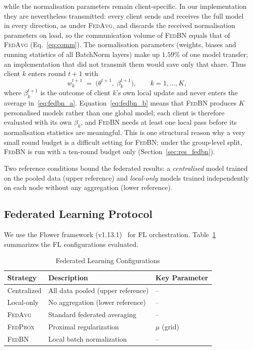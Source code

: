 \documentclass[journal]{IEEEtran}
\newcommand{\fedavg}{\textsc{FedAvg}}
\newcommand{\fedprox}{\textsc{FedProx}}
\newcommand{\fedbn}{\textsc{FedBN}}
\begin{document}
while the normalisation parameters remain client-specific. In our implementation they are nevertheless transmitted: every client sends and receives the full model in every direction, as under \fedavg{}, and discards the received normalisation parameters on load, so the communication volume of \fedbn{} equals that of \fedavg{} (Eq.~\eqref{eq:comm}). The normalisation parameters (weights, biases and running statistics of all BatchNorm layers) make up $1.59$\% of one model transfer; an implementation that did not transmit them would save only that share. Thus client $k$ enters round $t+1$ with
\begin{equation}
w_k^{t+1} \;=\; \bigl(\theta^{t+1},\; \beta_k^{t+1}\bigr), \qquad k = 1,\dots,K ,
\label{eq:fedbn_b}
\end{equation}
where $\beta_k^{t+1}$ is the outcome of client $k$'s own local update and never enters the average in~\eqref{eq:fedbn_a}.
Equation~\eqref{eq:fedbn_b} means that \fedbn{} produces $K$ personalised models rather than one global model; each client is therefore evaluated with its own $\beta_k$, and \fedbn{} needs at least one local pass before its normalisation statistics are meaningful. This is one structural reason why a very small round budget is a difficult setting for \fedbn{}; under the group-level split, \fedbn{} is run with a ten-round budget only (Section~\ref{sec:res_fedbn}).

Two reference conditions bound the federated results: a \emph{centralised} model trained on the pooled data (upper reference) and \emph{local-only} models trained independently on each node without any aggregation (lower reference).

\subsection{Federated Learning Protocol}

We use the Flower framework (v1.13.1)~\cite{beutel2020flower} for FL orchestration. Table~\ref{tab:fl_config} summarizes the FL configurations evaluated.

\begin{table}[t]
\centering
\caption{Federated Learning Configurations}
\label{tab:fl_config}
\begin{tabular}{@{}lll@{}}
\toprule
\textbf{Strategy} & \textbf{Description} & \textbf{Key Parameter} \\
\midrule
Centralized & All data pooled (upper reference) & -- \\
Local-only & No aggregation (lower reference) & -- \\
\fedavg{} & Standard federated averaging & -- \\
\fedprox{} & Proximal regularization & $\mu$ (grid) \\
\fedbn{} & Local batch normalization & -- \\
\bottomrule
\end{tabular}
\end{table}
\end{document}
